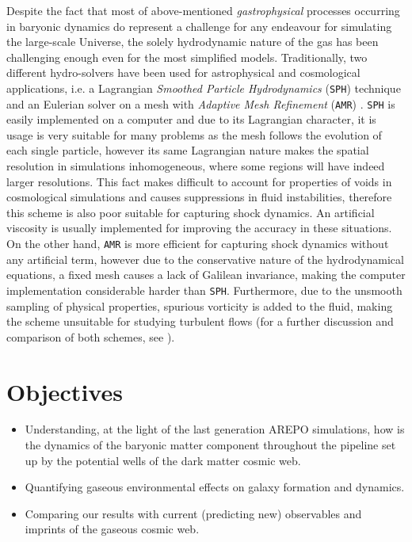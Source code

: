 \documentclass[a4,useAMS,usenatbib,usegraphicx,12pt]{article}
\begin{document}
Despite the fact that most of above-mentioned \textit{gastrophysical} processes
occurring in baryonic dynamics do represent a challenge for any endeavour for 
simulating the large-scale Universe, the solely hydrodynamic nature of the gas
has been challenging enough even for the most simplified models. Traditionally,
two different hydro-solvers have been used for astrophysical and cosmological 
applications, i.e. a Lagrangian \textit{Smoothed Particle Hydrodynamics} 
(\texttt{SPH}) technique \citep{Monaghan92} and an Eulerian solver on a mesh 
with \textit{Adaptive Mesh Refinement} (\texttt{AMR}) \citep{Berger89}. 
\texttt{SPH} is easily implemented on a computer and due to its Lagrangian 
character, it is usage is very suitable for many problems as the mesh follows 
the evolution of each single particle, however its same Lagrangian nature makes 
the spatial resolution in simulations inhomogeneous, where some regions will 
have indeed larger resolutions. This fact makes difficult to account for 
properties of voids in cosmological simulations and causes suppressions in fluid
instabilities, therefore this scheme is also poor suitable for capturing shock 
dynamics. An artificial viscosity is usually implemented for improving the 
accuracy in these situations. On the other hand, \texttt{AMR} is more efficient
for capturing shock dynamics without any artificial term, however due to the 
conservative nature of the hydrodynamical equations, a fixed mesh causes a lack 
of Galilean invariance, making the computer implementation considerable harder 
than \texttt{SPH}. Furthermore, due to the unsmooth sampling of physical 
properties, spurious vorticity is added to the fluid, making the scheme 
unsuitable for studying turbulent flows (for a further discussion and 
comparison of both schemes, see \citet{Plewa01}).



\newpage
\section{Objectives}


\begin{itemize}

\item[\checkmark] Understanding, at the light of the last generation AREPO 
simulations, how is the dynamics of the baryonic matter component throughout
the pipeline set up by the potential wells of the dark matter cosmic web.

\item[\checkmark] Quantifying gaseous environmental effects on galaxy formation
and dynamics.

\item[\checkmark] Comparing our results with current (predicting new) observables 
and imprints of the gaseous cosmic web.


\end{itemize}
\end{document}
